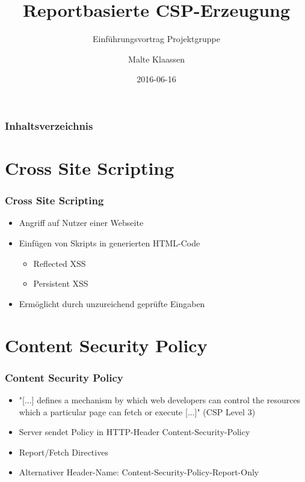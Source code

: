\documentclass[handout]{beamer}
\title[Reportbasierte CSP Erzeugung]{Reportbasierte CSP-Erzeugung}
\subtitle{Einführungsvortrag Projektgruppe}
\author[Klaassen]{Malte Klaassen}
\date{2016-06-16}
\begin{document}
\begin{frame}%
\titlepage
\end{frame}

\begin{frame}%
	\frametitle{Inhaltsverzeichnis}
	\tableofcontents%
\end{frame}

\section{Cross Site Scripting}
\begin{frame}[c]
\frametitle{Cross Site Scripting}
\begin{itemize}
\item Angriff auf Nutzer einer Webseite
\item Einfügen von Skripts in generierten HTML-Code
\begin{itemize}
\item Reflected XSS
\item Persistent XSS
\end{itemize}
\item Ermöglicht durch unzureichend geprüfte Eingaben
\end{itemize}
\end{frame}

\section{Content Security Policy}
\begin{frame}[c]
\frametitle{Content Security Policy}
\begin{itemize}
\item "[...] defines a mechanism by which web developers can control the resources which a particular page can fetch or execute [...]" (CSP Level 3)
\item Server sendet Policy in HTTP-Header Content-Security-Policy
\item Report/Fetch Directives
\item Alternativer Header-Name: Content-Security-Policy-Report-Only
\end{itemize}
\end{frame}
\end{document}
